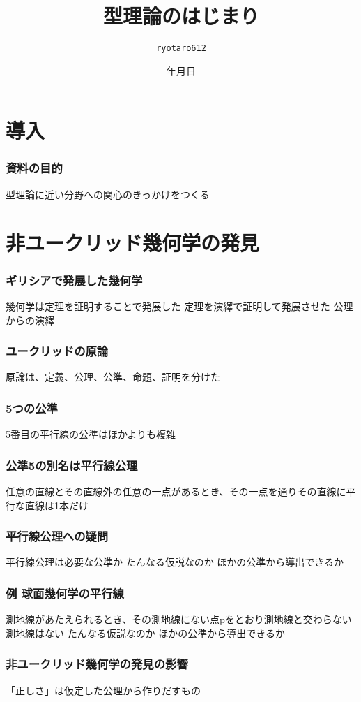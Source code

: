 \documentclass[unicode, 14pt, aspectratio=169]{beamer}
\date{\number\year 年\number\month 月\number\day 日}
\title{型理論のはじまり}
\author{\texttt{ryotaro612}}
\begin{document}
\begin{frame}
\titlepage
\end{frame}
\section{導入}
\begin{frame}
  \frametitle{資料の目的}
  {\large 型理論に近い分野への関心のきっかけをつくる}
\end{frame}
\section{非ユークリッド幾何学の発見}
\begin{frame}
  \frametitle{ギリシアで発展した幾何学}
  {\large 幾何学は定理を証明することで発展した}
  定理を演繹で証明して発展させた
  公理からの演繹
\end{frame}
\begin{frame}
  \frametitle{ユークリッドの原論}
  {\large 原論は、定義、公理、公準、命題、証明を分けた}
\end{frame}
\begin{frame}
  \frametitle{5つの公準}
  {\large 5番目の平行線の公準はほかよりも複雑}
\end{frame}
\begin{frame}
  \frametitle{公準5の別名は平行線公理}
  {\large 任意の直線とその直線外の任意の一点があるとき、その一点を通りその直線に平行な直線は1本だけ}
\end{frame}
\begin{frame}
  \frametitle{平行線公理への疑問}
  {\large 平行線公理は必要な公準か}
  たんなる仮説なのか
  ほかの公準から導出できるか
\end{frame}
\begin{frame}
  \frametitle{例 球面幾何学の平行線}
  {\large 測地線があたえられるとき、その測地線にない点pをとおり測地線と交わらない測地線はない}
  たんなる仮説なのか
  ほかの公準から導出できるか
\end{frame}
\begin{frame}
  \frametitle{非ユークリッド幾何学の発見の影響}
  {\large 「正しさ」は仮定した公理から作りだすもの}
\end{frame}
\end{document}

